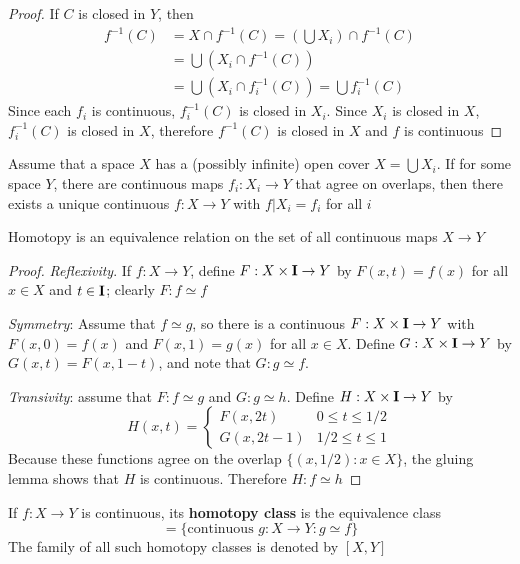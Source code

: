 \documentclass[11pt]{article}
\begin{document}
\begin{proof}
If \(C\) is closed in \(Y\), then
\begin{align*}
f^{-1}(C)&=X\cap f^{-1}(C)=(\bigcup X_i)\cap f^{-1}(C)\\
&=\bigcup (X_i\cap f^{-1}(C))\\
&=\bigcup (X_i\cap f_i^{-1}(C))=\bigcup f_i^{-1}(C)
\end{align*}
Since each \(f_i\) is continuous, \(f_i^{-1}(C)\) is closed in \(X_i\). Since \(X_i\) is closed
in \(X\), \(f_i^{-1}(C)\) is closed in \(X\), therefore \(f^{-1}(C)\) is closed in \(X\) and \(f\)
is continuous
\end{proof}

\begin{lemma}
Assume that a space \(X\) has a (possibly infinite) open cover \(X=\bigcup X_i\). If for some
space \(Y\), there are continuous maps \(f_i:X_i\to Y\) that agree on overlaps, then there exists a
unique continuous \(f:X\to Y\) with \(f|X_i=f_i\) for all \(i\)
\end{lemma}

\begin{theorem}[]
Homotopy is an equivalence relation on the set of all continuous maps \(X\to Y\)
\end{theorem}

\begin{proof}
\emph{Reflexivity}. If \(f:X\to Y\), define \(F:X\times\operatorname{\textbf{I}}\to Y\) by \(F(x,t)=f(x)\) for all \(x\in X\) and \(t\in\operatorname{\textbf{I}}\);
clearly \(F:f\simeq f\)

\emph{Symmetry}: Assume that \(f\simeq g\), so there is a continuous \(F:X\times\operatorname{\textbf{I}}\to Y\) with \(F(x,0)=f(x)\)
and \(F(x,1)=g(x)\) for all \(x\in X\). Define \(G:X\times\operatorname{\textbf{I}}\to Y\) by \(G(x,t)=F(x,1-t)\), and note
that \(G:g\simeq f\).

\emph{Transivity}: assume that \(F:f\simeq g\) and \(G:g\simeq h\). Define \(H:X\times\operatorname{\textbf{I}}\to Y\) by
\begin{equation*}
H(x,t)=
\begin{cases}
F(x,2t)&0\le t\le 1/2\\
G(x,2t-1)&1/2\le t\le 1
\end{cases}
\end{equation*}
Because these functions agree on the overlap \(\{(x,1/2):x\in X\}\), the gluing lemma shows
that \(H\) is continuous. Therefore \(H:f\simeq h\)
\end{proof}

\begin{definition}[]
If \(f:X\to Y\) is continuous, its \textbf{homotopy class} is the equivalence class
\begin{equation*}
[f]=\{\text{continuous }g:X\to Y:g\simeq f\}
\end{equation*}
The family of all such homotopy classes is denoted by \([X,Y]\)
\end{definition}
\end{document}
